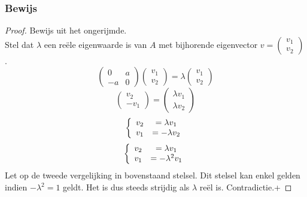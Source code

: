 \documentclass[lineaire_algebra_oplossingen.tex]{subfiles}
\begin{document}
\subsubsection*{Bewijs}
\begin{proof}
Bewijs uit het ongerijmde.\\
Stel dat $\lambda$ een re\"ele eigenwaarde is van $A$ met bijhorende eigenvector $v = \begin{pmatrix}v_1\\v_2\end{pmatrix}$.
\[
\begin{pmatrix}
0 & a\\
-a & 0
\end{pmatrix}
\begin{pmatrix}v_1\\v_2\end{pmatrix}
=\lambda 
\begin{pmatrix}v_1\\v_2\end{pmatrix}
\]
\[
\begin{pmatrix}
v_2\\-v_1
\end{pmatrix}
=
\begin{pmatrix}
\lambda v_1\\\lambda v_2
\end{pmatrix}
\]
\[
\left\{
\begin{array}{c c}
v_2 &= \lambda v_1\\
v_1 &= -\lambda v_2
\end{array}
\right.
\]
\[
\left\{
\begin{array}{c c}
v_2 &= \lambda v_1\\
v_1 &= -\lambda^2 v_1
\end{array}
\right.
\]
Let op de tweede vergelijking in bovenstaand stelsel. Dit stelsel kan enkel gelden indien $-\lambda^2 = 1$ geldt. Het is dus steeds strijdig als $\lambda$ re\"el is. Contradictie.+
\end{proof}
\end{document}
